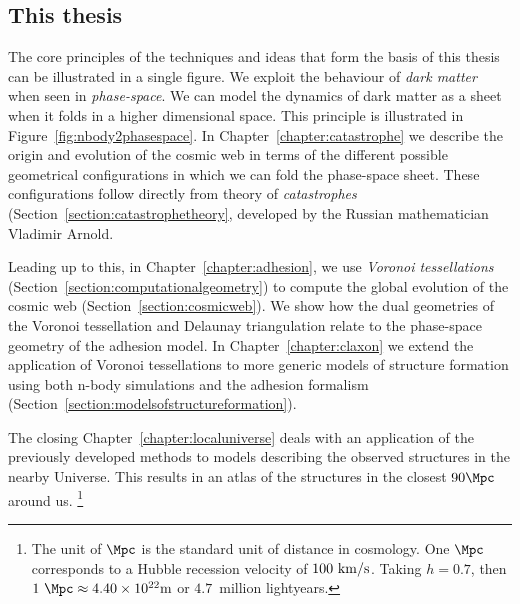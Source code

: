 \subsection{This thesis}
The core principles of the techniques and ideas that form the basis of this thesis can be illustrated in a single figure. We exploit the behaviour of \emph{dark matter} when seen in \emph{phase-space}. We can model the dynamics of dark matter as a sheet when it folds in a higher dimensional space.
This principle is illustrated in Figure~\ref{fig:nbody2phasespace}. In Chapter~\ref{chapter:catastrophe} we describe the origin and evolution of the cosmic web in terms of the different possible geometrical configurations in which we can fold the phase-space sheet.
These configurations follow directly from theory of \emph{catastrophes} (Section~\ref{section:catastrophetheory}, developed by the Russian mathematician Vladimir Arnold.

Leading up to this, in Chapter~\ref{chapter:adhesion}, we use \emph{Voronoi tessellations} (Section~\ref{section:computationalgeometry}) to compute the global evolution of the cosmic web (Section~\ref{section:cosmicweb}).
We show how the dual geometries of the Voronoi tessellation and Delaunay triangulation relate to the phase-space geometry of the adhesion model. In Chapter~\ref{chapter:claxon} we extend the application of Voronoi tessellations to more generic models of structure formation using both n-body simulations and the adhesion formalism (Section~\ref{section:modelsofstructureformation}).

The closing Chapter~\ref{chapter:localuniverse} deals with an application of the previously developed methods to models describing the observed structures in the nearby Universe. This results in an atlas of the structures in the closest $90 \Mpc$ around us. \footnote{The unit of $\Mpc$ is the standard unit of distance in cosmology. One $\Mpc$ corresponds to a Hubble recession velocity of $100\ {\rm km/s}$. Taking $h = 0.7$, then $1\ \Mpc \approx 4.40 \times 10^{22} {\rm m}$ or $4.7$~million lightyears.}


